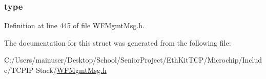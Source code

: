 \subsubsection[{type}]{ type}\label{structmgmt_indicate_hdr_struct_a631bceb766461ab7475c7ed56717aac8}


Definition at line 445 of file W\+F\+Mgmt\+Msg.\+h.



The documentation for this struct was generated from the following file\+:\begin{DoxyCompactItemize}
\item 
C\+:/\+Users/mainuser/\+Desktop/\+School/\+Senior\+Project/\+Eth\+Kit\+T\+C\+P/\+Microchip/\+Include/\+T\+C\+P\+I\+P Stack/\hyperlink{_w_f_mgmt_msg_8h}{W\+F\+Mgmt\+Msg.\+h}\end{DoxyCompactItemize}
